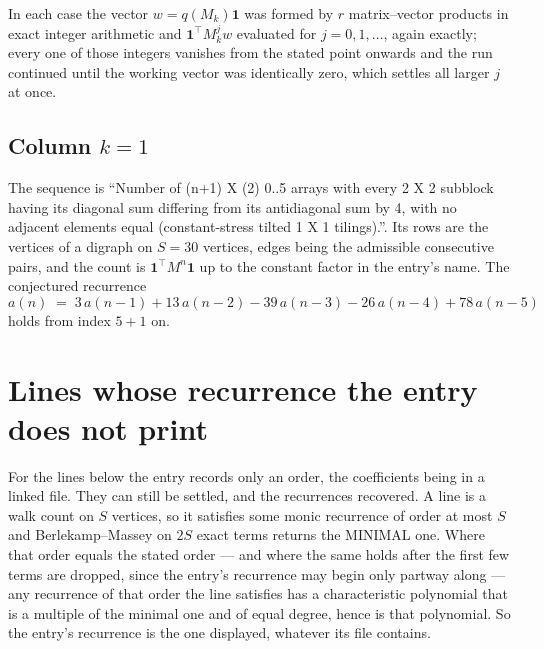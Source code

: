 \documentclass[11pt,a4paper]{article}
\theoremstyle{plain}
\theoremstyle{definition}
\begin{document}
In each case the vector $w=q(M_k)\mathbf{1}$ was formed by $r$ matrix--vector products in
exact integer arithmetic and $\mathbf{1}^{\!\top}M_k^{j}w$ evaluated for $j=0,1,\dots$,
again exactly; every one of those integers vanishes from the stated point onwards and the run
continued until the working vector was identically zero, which settles all larger $j$ at once.

\subsection*{Column $k$$=1$}
The sequence is ``Number of (n+1) X (2) 0..5 arrays with every 2 X 2 subblock having its diagonal sum differing from its antidiagonal sum by 4, with no adjacent elements equal (constant-stress tilted 1 X 1 tilings).''. Its rows are the vertices of a digraph on
$S=30$ vertices, edges being the admissible consecutive pairs, and the count is
$\mathbf{1}^{\!\top}M^{n}\mathbf{1}$ up to the constant factor in the entry's name.
The conjectured recurrence
\[
a(n)\;=\;3\,a(n-1) + 13\,a(n-2) - 39\,a(n-3) - 26\,a(n-4) + 78\,a(n-5)
\]
holds from index $5+1$ on.


\section{Lines whose recurrence the entry does not print}

For the lines below the entry records only an order, the coefficients being in a linked file.
They can still be settled, and the recurrences recovered. A line is a walk count on $S$
vertices, so it satisfies some monic recurrence of order at most $S$ and Berlekamp--Massey on
$2S$ exact terms returns the MINIMAL one. Where that order equals the stated order --- and
where the same holds after the first few terms are dropped, since the entry's recurrence may
begin only partway along --- any recurrence of that order the line satisfies has a
characteristic polynomial that is a multiple of the minimal one and of equal degree, hence is
that polynomial. So the entry's recurrence is the one displayed, whatever its file contains.
\end{document}
